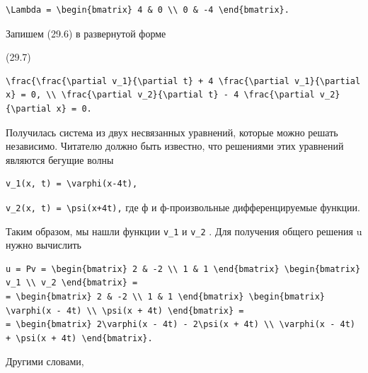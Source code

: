 \documentclass[
  ukrainian,
]{article}
\begin{document}
\begin{verbatim}
\Lambda = \begin{bmatrix} 4 & 0 \\ 0 & -4 \end{bmatrix}.
\end{verbatim}

Запишем (29.6) в развернутой форме

(29.7)

\begin{verbatim}
\frac{\frac{\partial v_1}{\partial t} + 4 \frac{\partial v_1}{\partial x} = 0, \\ \frac{\partial v_2}{\partial t} - 4 \frac{\partial v_2}{\partial x} = 0.
\end{verbatim}

Получилась система из двух несвязанных уравнений, которые можно решать
независимо. Читателю должно быть известно, что решениями этих уравнений
являются бегущие волны

\begin{verbatim}
v_1(x, t) = \varphi(x-4t),
\end{verbatim}

\texttt{v\_2(x,\ t)\ =\ \textbackslash{}psi(x+4t),} где ф и
ф-произвольные дифференцируемые функции.

Таким образом, мы нашли функции \texttt{v\_1} и \texttt{v\_2} . Для
получения общего решения u нужно вычислить

\begin{verbatim}
u = Pv = \begin{bmatrix} 2 & -2 \\ 1 & 1 \end{bmatrix} \begin{bmatrix} v_1 \\ v_2 \end{bmatrix} =
= \begin{bmatrix} 2 & -2 \\ 1 & 1 \end{bmatrix} \begin{bmatrix} \varphi(x - 4t) \\ \psi(x + 4t) \end{bmatrix} =
= \begin{bmatrix} 2\varphi(x - 4t) - 2\psi(x + 4t) \\ \varphi(x - 4t) + \psi(x + 4t) \end{bmatrix}.
\end{verbatim}

Другими словами,
\end{document}
